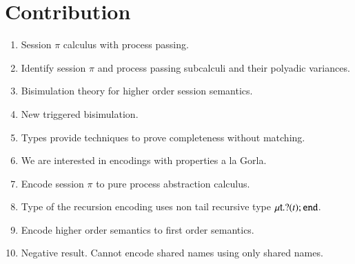 \section*{Contribution}
\begin{enumerate}
	\item	Session $\pi$ calculus with process passing.
	\item	Identify session $\pi$ and process passing subcalculi and their polyadic variances.
	\item	Bisimulation theory for higher order session semantics.
	\item	New triggered bisimulation.
	\item	Types provide techniques to prove completeness without matching.
	\item	We are interested in encodings with properties a la Gorla.
	\item	Encode session $\pi$ to pure process abstraction calculus.
	\item	Type of the recursion encoding uses non tail recursive type $\mu\mathsf{t}.? (t) ; \mathtt{end}$.
	\item	Encode higher order semantics to first order semantics.
	\item	Negative result. Cannot encode shared names using only shared names.
\end{enumerate}
